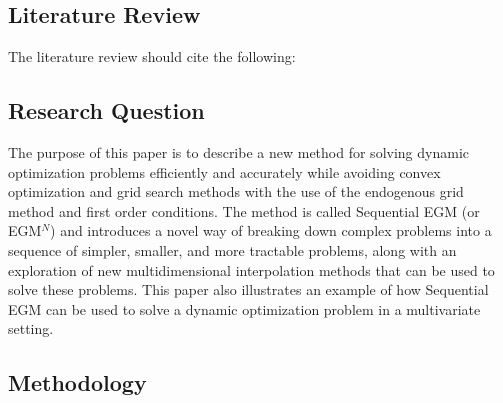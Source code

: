 \documentclass[\econtexRoot/EGMN]{subfiles}
\begin{document}
\subsection{Literature Review} %


The literature review should cite the following:

\cite{Druedahl2021-wl,Ludwig2018-uz,Ludwig2016-tq,Iskhakov2015-jy,Maliar2013-sv,Carroll2006-wq,Jorgensen2013-du,Maliar2014-qj,Scheidegger2019-xf,Bodie1992-yp,Maliar2011-dj,White2015-fg,Hintermaier2010-io,Barillas2007-uh,Druedahl2017-vn,Clausen2020-zo,Carroll2009-zq,Iskhakov2017-my,Mendoza2020-jd,Fella2014-my}

\subsection{Research Question} %


The purpose of this paper is to describe a new method for solving dynamic optimization problems efficiently and accurately while avoiding convex optimization and grid search methods with the use of the endogenous grid method and first order conditions. The method is called Sequential EGM (or EGM$^N$) and introduces a novel way of breaking down complex problems into a sequence of simpler, smaller, and more tractable problems, along with an exploration of new multidimensional interpolation methods that can be used to solve these problems. This paper also illustrates an example of how Sequential EGM can be used to solve a dynamic optimization problem in a multivariate setting.

\subsection{Methodology} %
\end{document}

